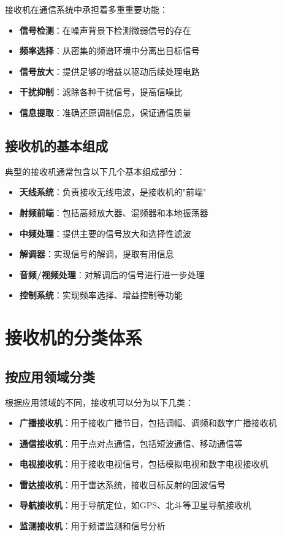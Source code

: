 \documentclass[12pt,UTF8]{ctexbook}
\begin{document}
接收机在通信系统中承担着多重重要功能：

\begin{itemize}[leftmargin=3.5em]
    \item \textbf{信号检测}：在噪声背景下检测微弱信号的存在
    \item \textbf{频率选择}：从密集的频谱环境中分离出目标信号
    \item \textbf{信号放大}：提供足够的增益以驱动后续处理电路
    \item \textbf{干扰抑制}：滤除各种干扰信号，提高信噪比
    \item \textbf{信息提取}：准确还原调制信息，保证通信质量
\end{itemize}

\subsection{接收机的基本组成}

典型的接收机通常包含以下几个基本组成部分：

\begin{itemize}[leftmargin=3.5em]
    \item \textbf{天线系统}：负责接收无线电波，是接收机的"前端"
    \item \textbf{射频前端}：包括高频放大器、混频器和本地振荡器
    \item \textbf{中频处理}：提供主要的信号放大和选择性滤波
    \item \textbf{解调器}：实现信号的解调，提取有用信息
    \item \textbf{音频/视频处理}：对解调后的信号进行进一步处理
    \item \textbf{控制系统}：实现频率选择、增益控制等功能
\end{itemize}

\section{接收机的分类体系}

\subsection{按应用领域分类}

根据应用领域的不同，接收机可以分为以下几类：

\begin{itemize}[leftmargin=3.5em]
    \item \textbf{广播接收机}：用于接收广播节目，包括调幅、调频和数字广播接收机
    \item \textbf{通信接收机}：用于点对点通信，包括短波通信、移动通信等
    \item \textbf{电视接收机}：用于接收电视信号，包括模拟电视和数字电视接收机
    \item \textbf{雷达接收机}：用于雷达系统，接收目标反射的回波信号
    \item \textbf{导航接收机}：用于导航定位，如GPS、北斗等卫星导航接收机
    \item \textbf{监测接收机}：用于频谱监测和信号分析
\end{itemize}
\end{document}
